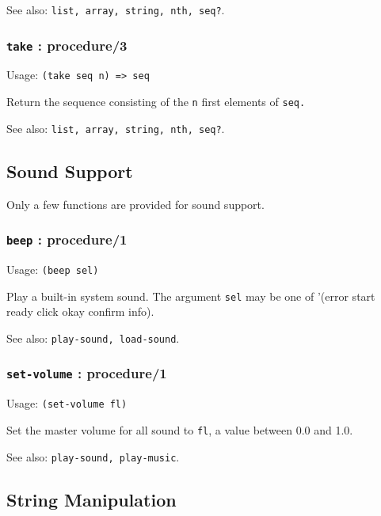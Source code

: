 \documentclass[
]{article}
\newcommand{\passthrough}[1]{#1}
\begin{document}
See also: \passthrough{\lstinline!list, array, string, nth, seq?!}.

\hypertarget{take-procedure3}{%
\subsubsection{\texorpdfstring{\texttt{take} :
procedure/3}{take : procedure/3}}\label{take-procedure3}}

Usage: \passthrough{\lstinline!(take seq n) => seq!}

Return the sequence consisting of the \passthrough{\lstinline!n!} first
elements of \passthrough{\lstinline!seq.!}

See also: \passthrough{\lstinline!list, array, string, nth, seq?!}.

\hypertarget{sound-support}{%
\subsection{Sound Support}\label{sound-support}}

Only a few functions are provided for sound support.

\hypertarget{beep-procedure1}{%
\subsubsection{\texorpdfstring{\texttt{beep} :
procedure/1}{beep : procedure/1}}\label{beep-procedure1}}

Usage: \passthrough{\lstinline!(beep sel)!}

Play a built-in system sound. The argument \passthrough{\lstinline!sel!}
may be one of '(error start ready click okay confirm info).

See also: \passthrough{\lstinline!play-sound, load-sound!}.

\hypertarget{set-volume-procedure1}{%
\subsubsection{\texorpdfstring{\texttt{set-volume} :
procedure/1}{set-volume : procedure/1}}\label{set-volume-procedure1}}

Usage: \passthrough{\lstinline!(set-volume fl)!}

Set the master volume for all sound to \passthrough{\lstinline!fl!}, a
value between 0.0 and 1.0.

See also: \passthrough{\lstinline!play-sound, play-music!}.

\hypertarget{string-manipulation}{%
\subsection{String Manipulation}\label{string-manipulation}}
\end{document}
